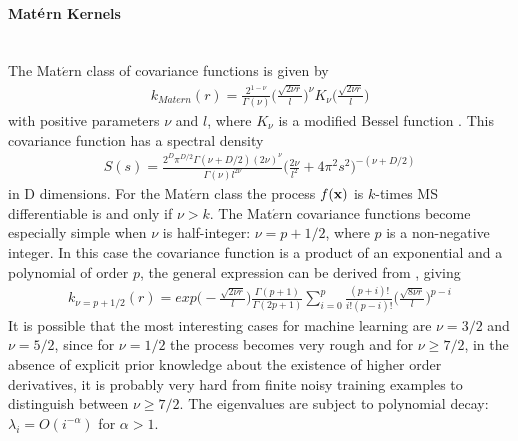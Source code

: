 \documentclass[11pt]{article}
\begin{document}
\paragraph{Mat$\acute{{\bf e}}$rn Kernels}\mbox{}\\
The Mat$\acute{e}$rn class of covariance functions is given by
\begin{align*}
k_{Matern}(r)=\frac{2^{1-\nu}}{\Gamma(\nu)}\Big(\frac{\sqrt{2\nu r}}{l}\Big)^\nu K_\nu \Big(\frac{\sqrt{2\nu r}}{l}\Big)
\end{align*}
with positive parameters $\nu$ and $l$, where $K_\nu$ is a modified Bessel function \citep{abramowitz_handbook_1974}. This covariance function has a spectral density
\begin{align*}
S(s)=\frac{2^D\pi^{D/2}\Gamma(\nu+D/2)(2\nu)^\nu}{\Gamma(\nu)l^{2\nu}}\Big(\frac{2\nu}{l^2}+4\pi^2s^2\Big)^{-(\nu+D/2)}
\end{align*}
in D dimensions. For the Mat$\acute{e}$rn class the process $f({\bf x})$ is $k$-times MS differentiable is and only if $\nu>k$. The Mat$\acute{e}$rn covariance functions become especially simple when $\nu$ is half-integer: $\nu=p+1/2$, where $p$ is a non-negative integer. In this case the covariance function is a product of an exponential and a polynomial of order $p$, the general expression can be derived from \citep{abramowitz_handbook_1974}, giving
\begin{align*}
k_{\nu=p+1/2}(r)=exp\Big(-\frac{\sqrt{2\nu r}}{l}\Big)\frac{\Gamma(p+1)}{\Gamma(2p+1)}\sum_{i=0}^p \frac{(p+i)!}{i!(p-i)!}\Big(\frac{\sqrt{8\nu r}}{l}\Big)^{p-i}
\end{align*}
It is possible that the most interesting cases for machine learning are $\nu=3/2$ and $\nu=5/2$, since for $\nu=1/2$ the process becomes very rough and for $\nu \geq 7/2$, in the absence of explicit prior knowledge about the existence of higher order derivatives, it is probably very hard from finite noisy training examples to distinguish between $\nu \geq 7/2$. The eigenvalues are subject to polynomial decay: $\lambda_i=O(i^{-\alpha})$ for $\alpha>1$.
\end{document}
